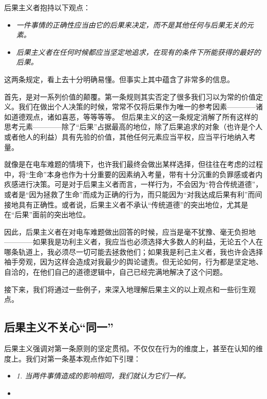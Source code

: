 \documentclass[10pt]{article}
\begin{document}
    后果主义者抱持以下观点：
      
     \begin{itemize}
    \item \emph{ 一件事情的正确性应当由它的后果来决定，而不是其他任何与后果无关的元素。}
    \item  \emph{ 后果主义者在任何时候都应当坚定地追求，在现有的条件下所能获得的最好的后果。}
    \end{itemize}
       
   这两条规定，看上去十分明确易懂。但事实上其中蕴含了非常多的信息。
     
   首先，是对一系列价值的颠覆。第一条规则其实否定了很多我们习以为常的价值定义。我们在做出个人决策的时候，常常不仅将后果作为唯一的参考因素————诸如道德观点，诸如喜恶，等等等等。 但后果主义的这一条规定消解了所有这样的思考元素————除了“后果”占据最高的地位，除了后果追求的对象（也许是个人或者他人的利益）具有先验的价值，其他任何元素应当平权，应当平行地纳入考量。
     
   就像是在电车难题的情境下，也许我们最终会做出某样选择，但往往在考虑的过程中，将“生命”本身也作为十分重要的因素纳入考量，带有十分沉重的负罪感或者内疚感进行决策。可是对于后果主义者而言，一样行为，不会因为“符合传统道德”，或者是“因为拯救了生命”而成为正确的行为，而只能因为“对我达成后果有利”而间接地具有正确性。或者说，后果主义者不承认“传统道德”的突出地位，尤其是在“后果”面前的突出地位。
      
   因此，后果主义者在对电车难题做出回答的时候，应当是毫不犹豫、毫无负担地————如果我是功利主义者，我应当也必须选择大多数人的利益，无论五个人在哪条轨道上，我必须尽一切可能去拯救他们；如果我是利己主义者，我也许会选择袖手旁观，因为这样会造成对我最少的舆论谴责。但无论如何，行为都是坚定地、自洽的，在他们自己的道德逻辑中，自己已经完满地解决了这个问题。

   接下来，我们将通过一些例子，来深入地理解后果主义的以上观点和一些衍生观点。
    
   \subsection{后果主义不关心“同一”}
     
     后果主义强调对第一条原则的坚定贯彻。不仅仅在行为的维度上，甚至在认知的维度上。我们对第一条基本观点作如下引理：
     
    \begin{itemize}
    \item \emph{1. 当两件事情造成的影响相同，我们就认为它们一样。}
    
    \item {}
    \end{itemize}
    
\end{document}
